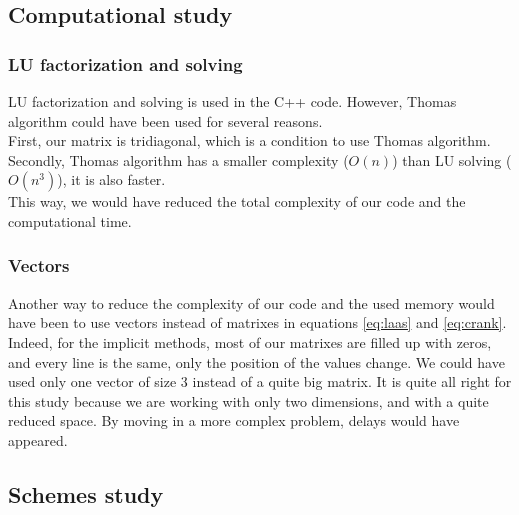 \documentclass{article}
\begin{document}
            \subsection{Computational study}
                \subsubsection{LU factorization and solving}
                    LU factorization and solving is used in the C++ code. However, Thomas algorithm could have been used for several 
                    reasons.
                    \\
                    First, our matrix is tridiagonal, which is a condition to use Thomas algorithm.
                    \\
                    Secondly, Thomas algorithm has a smaller complexity ($O(n)$) than LU solving ($O(n^3)$), it is also faster.
                    \\
                    This way, we would have reduced the total complexity of our code and the computational time.
                \subsubsection{Vectors}
                    Another way to reduce the complexity of our code and the used memory would have been to use vectors instead
                    of matrixes in equations \eqref{eq:laas} and \eqref{eq:crank}. Indeed, for the implicit methods, most of our matrixes are filled up with zeros, and every line is
                    the same, only the position of the values change. We could have used only one vector of size 3 instead of a quite big matrix.
                    It is quite all right for this study because we are working with only two dimensions, and with a quite reduced space.
                    By moving in a more complex problem, delays would have appeared.
            \subsection{Schemes study}
\end{document}
